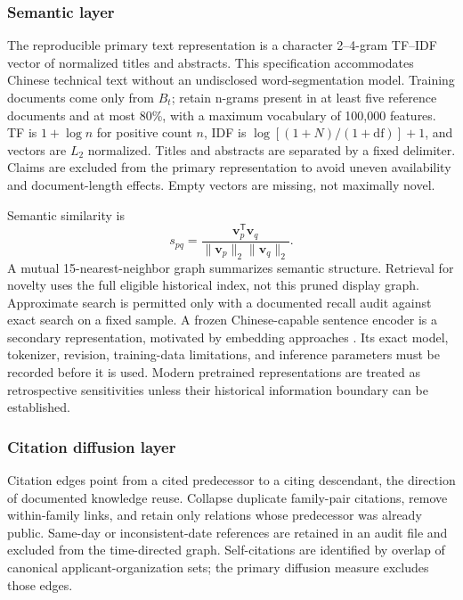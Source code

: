 \subsubsection{Semantic layer}
The reproducible primary text representation is a character 2--4-gram TF--IDF
vector of normalized titles and abstracts. This specification accommodates Chinese
technical text without an undisclosed word-segmentation model. Training documents
come only from $B_t$; retain n-grams present in at least five reference documents
and at most 80\%, with a maximum vocabulary of 100,000 features. TF is
$1+\log n$ for positive count $n$, IDF is
$\log[(1+N)/(1+\mathrm{df})]+1$, and vectors are $L_2$ normalized.
Titles and abstracts are separated by a fixed delimiter. Claims are excluded
from the primary representation to avoid uneven availability and document-length
effects. Empty vectors are missing, not maximally novel.

Semantic similarity is
\begin{equation}
 s_{pq}=\frac{\mathbf{v}_p^{\mathsf T}\mathbf{v}_q}
 {\|\mathbf{v}_p\|_2\|\mathbf{v}_q\|_2}.
 \label{eq:semantic}
\end{equation}
A mutual 15-nearest-neighbor graph summarizes semantic structure. Retrieval for
novelty uses the full eligible historical index, not this pruned display graph.
Approximate search is permitted only with a documented recall audit against
exact search on a fixed sample. A frozen Chinese-capable sentence encoder is a
secondary representation, motivated by embedding approaches
\citep{reimers2019,sarica2020}. Its exact model, tokenizer, revision, training-data
limitations, and inference parameters must be recorded before it is used.
Modern pretrained representations are treated as retrospective sensitivities
unless their historical information boundary can be established.

\subsubsection{Citation diffusion layer}
Citation edges point from a cited predecessor to a citing descendant, the direction
of documented knowledge reuse. Collapse duplicate family-pair citations, remove
within-family links, and retain only relations whose predecessor was already
public. Same-day or inconsistent-date references are retained in an audit file
and excluded from the time-directed graph. Self-citations are identified by
overlap of canonical applicant-organization sets; the primary diffusion measure
excludes those edges.

